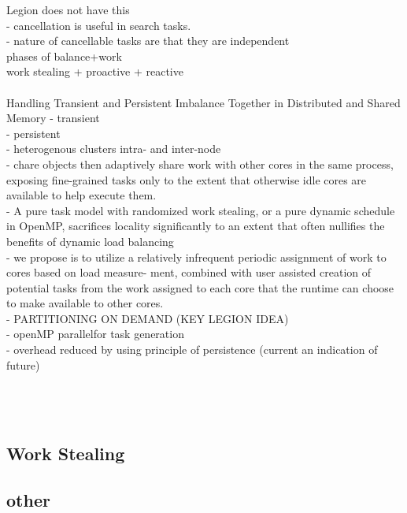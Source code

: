 \documentclass{article}
\begin{document}
Legion does not have this\\
	- cancellation is useful in search tasks.\\
	- nature of cancellable tasks are that they are independent\\

phases of balance+work\\
 work stealing + proactive + reactive\\

\cite{CCGrid2018}\\
Handling Transient and Persistent Imbalance Together in Distributed and Shared Memory
- transient \\
- persistent \\
- heterogenous clusters intra- and inter-node\\
- chare objects then adaptively share work with other cores in the same process,
  exposing fine-grained tasks only to the extent that otherwise idle cores are
available to help execute them.\\
- A pure task model with randomized work stealing, or a pure dynamic schedule in
  OpenMP, sacrifices locality significantly to an extent that often nullifies
the benefits of dynamic load balancing\\
- we propose is to utilize a relatively infrequent periodic assignment of work
  to cores based on load measure- ment, combined with user assisted creation of
potential tasks from the work assigned to each core that the runtime can choose
to make available to other cores.\\
- PARTITIONING ON DEMAND (KEY LEGION IDEA)\\
- openMP parallelfor task generation\\
- overhead reduced by using principle of persistence (current an indication of
  future)\\
\cite{8025281}\\
\cite{7307597}\\
\cite{Galvez:2017:ATM:3079079.3079104} \\%


\subsection{Work Stealing}
\cite{Yang2017}
\cite{Chen:2015:LWS:2775085.2766450}
\cite{Blumofe:1999:SMC:324133.324234}
\cite{Cilk}
\cite{Saraswat:2011:LGL:1941553.1941582}

\subsection{other}
\end{document}
